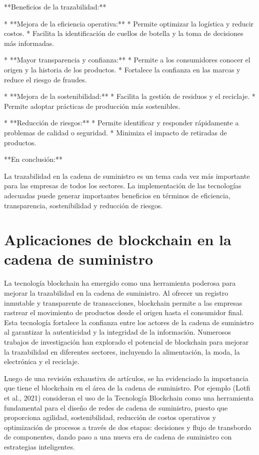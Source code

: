 \documentclass[main.tex]{subfiles}
\begin{document}
**Beneficios de la trazabilidad:**

* **Mejora de la eficiencia operativa:**
    * Permite optimizar la logística y reducir costos.
    * Facilita la identificación de cuellos de botella y la toma de decisiones más informadas.

* **Mayor transparencia y confianza:**
    * Permite a los consumidores conocer el origen y la historia de los productos.
    * Fortalece la confianza en las marcas y reduce el riesgo de fraudes.

* **Mejora de la sostenibilidad:**
    * Facilita la gestión de residuos y el reciclaje.
    * Permite adoptar prácticas de producción más sostenibles.

* **Reducción de riesgos:**
    * Permite identificar y responder rápidamente a problemas de calidad o seguridad.
    * Minimiza el impacto de retiradas de productos.

**En conclusión:**

La trazabilidad en la cadena de suministro es un tema cada vez más importante para las empresas de todos los sectores. La implementación de las tecnologías adecuadas puede generar importantes beneficios en términos de eficiencia, transparencia, sostenibilidad y reducción de riesgos.

\section{Aplicaciones de blockchain en la cadena de suministro}

La tecnología blockchain ha emergido como una herramienta poderosa para mejorar la trazabilidad en la cadena de suministro. Al ofrecer un registro inmutable y transparente de transacciones, blockchain permite a las empresas rastrear el movimiento de productos desde el origen hasta el consumidor final. Esta tecnología fortalece la confianza entre los actores de la cadena de suministro al garantizar la autenticidad y la integridad de la información. Numerosos trabajos de investigación han explorado el potencial de blockchain para mejorar la trazabilidad en diferentes sectores, incluyendo la alimentación, la moda, la electrónica y el reciclaje.

Luego de una revisión exhaustiva de artículos, se ha evidenciado la importancia que tiene
el blockchain en el área de la cadena de suministro. Por ejemplo (Lotfi et al., 2021) consideran el
uso de la Tecnología Blockchain como una herramienta fundamental para el diseño de redes de
cadena de suministro, puesto que proporciona agilidad, sostenibilidad, reducción de costos
operativos y optimización de procesos a través de dos etapas: decisiones y flujo de transbordo de
componentes, dando paso a una nueva era de cadena de suministro con estrategias inteligentes.
\end{document}
